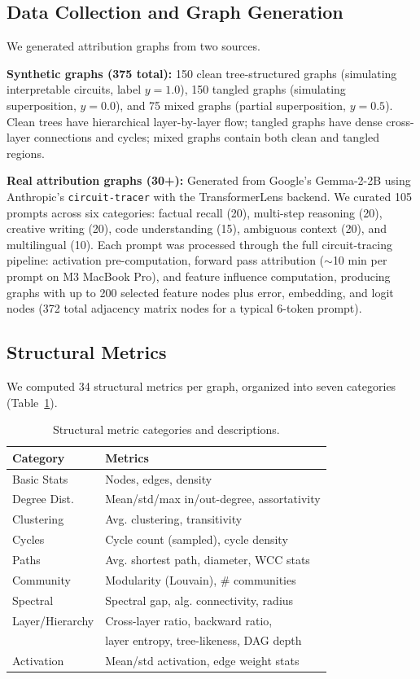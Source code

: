 \documentclass[10pt,twocolumn]{article}
\begin{document}
\subsection{Data Collection and Graph Generation}

We generated attribution graphs from two sources.

\textbf{Synthetic graphs (375 total):} 150 clean tree-structured graphs (simulating interpretable circuits, label $y=1.0$), 150 tangled graphs (simulating superposition, $y=0.0$), and 75 mixed graphs (partial superposition, $y=0.5$). Clean trees have hierarchical layer-by-layer flow; tangled graphs have dense cross-layer connections and cycles; mixed graphs contain both clean and tangled regions.

\textbf{Real attribution graphs (30+):} Generated from Google's Gemma-2-2B using Anthropic's \texttt{circuit-tracer} with the TransformerLens backend. We curated 105 prompts across six categories: factual recall (20), multi-step reasoning (20), creative writing (20), code understanding (15), ambiguous context (20), and multilingual (10). Each prompt was processed through the full circuit-tracing pipeline: activation pre-computation, forward pass attribution ($\sim$10 min per prompt on M3 MacBook Pro), and feature influence computation, producing graphs with up to 200 selected feature nodes plus error, embedding, and logit nodes (372 total adjacency matrix nodes for a typical 6-token prompt).

\subsection{Structural Metrics}

We computed 34 structural metrics per graph, organized into seven categories (Table~\ref{tab:metrics}).

\begin{table}[H]
\centering
\small
\caption{Structural metric categories and descriptions.}
\label{tab:metrics}
\begin{tabular}{@{}ll@{}}
\toprule
\textbf{Category} & \textbf{Metrics} \\
\midrule
Basic Stats & Nodes, edges, density \\
Degree Dist. & Mean/std/max in/out-degree, assortativity \\
Clustering & Avg. clustering, transitivity \\
Cycles & Cycle count (sampled), cycle density \\
Paths & Avg. shortest path, diameter, WCC stats \\
Community & Modularity (Louvain), \# communities \\
Spectral & Spectral gap, alg. connectivity, radius \\
Layer/Hierarchy & Cross-layer ratio, backward ratio, \\
& layer entropy, tree-likeness, DAG depth \\
Activation & Mean/std activation, edge weight stats \\
\bottomrule
\end{tabular}
\end{table}
\end{document}
